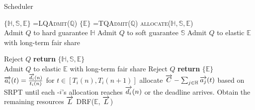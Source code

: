 \begin{algorithm}
	\small
\caption{\name Scheduler}
\label{algorithm1}
\begin{algorithmic}[1]
	\State $\{\mathbb{H},\mathbb{S},\mathbb{E}\}$ =\textsc{LQAdmit}($\mathbb{Q}$)\EndIf
{}
	\State $\{\mathbb{E}\}$ =\textsc{TQAdmit}($\mathbb{Q}$)\EndIf
\State \textsc{allocate}($\mathbb{H},\mathbb{S}, \mathbb{E}$)
\EndProcedure
\\
			\State Admit $Q$ to hard guarantee $\mathbb{H}$
		\Else
			\State Admit $Q$ to soft guarantee $\mathbb{S}$
		\EndIf
	\Else
		\State Admit $Q$ to elastic $\mathbb{E}$ with long-term fair share

	\EndIf
\Else 
	\State Reject $Q$
\EndIf
\EndFor
\State \textbf{return} $\{\mathbb{H},\mathbb{S},\mathbb{E}\}$	
\EndFunction
\\
		\State Admit $Q$ to elastic $\mathbb{E}$ with long-term fair share
	\Else 
		\State Reject $Q$
	\EndIf
\EndFor
\State \textbf{return} $\{\mathbb{E}\}$
\EndFunction
\\
\State $\protect\overrightarrow{a_i}(t)=\frac{\protect\overrightarrow{d_i}(n)}{t_i(n)}$ for $t\in[T_i(n),T_i(n+1)]$ %
\EndFor
{}
\State allocate $\protect\overrightarrow{C}-\sum_{j\in \mathbb{H}}\protect\overrightarrow{a_j}(t)$ based on SRPT until each {\burstq}-$i$'s allocation reaches $\protect\overrightarrow{d_i}(n)$ or the deadline arrives.
\EndFor
\State Obtain the remaining resources $\protect\overrightarrow{L}$
\State DRF($\mathbb{E}$, $\protect\overrightarrow{L}$)
\EndFunction
\end{algorithmic}
\end{algorithm}
